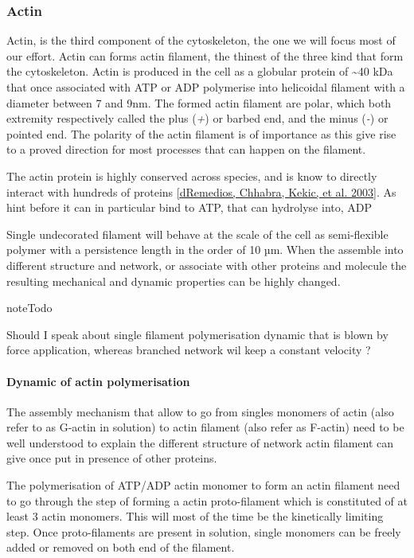 \documentclass[A4paperpaper,11pt,english]{sphinxmanual}
\begin{document}
\subsubsection{Actin}
\label{parts/part1:actin}
Actin, is the third component of the cytoskeleton, the one we will focus most
of our effort. Actin can forms actin filament, the thinest of the three kind
that form the cytoskeleton. Actin is produced in the cell as a globular protein
of \textasciitilde{}40 kDa that once associated with ATP or ADP polymerise into helicoidal
filament with a diameter between 7 and 9nm. The formed actin filament are
polar, which both extremity respectively called the plus (\emph{+}) or
barbed end, and the minus (\emph{-}) or pointed end. The polarity of the actin
filament is of importance as this give rise to a proved direction for most
processes that can happen on the filament.

The actin protein is highly conserved across species, and is know to directly
interact with hundreds of proteins {\hyperref[bibitem:dosremedios2003]{{[}dRemedios, Chhabra, Kekic,  et al.  2003{]}}}. As hint before it
can in particular bind to ATP, that can hydrolyse into, ADP

Single undecorated filament will behave at the scale of the cell as
semi-flexible polymer with a persistence length in the order of 10 µm. When the
assemble into different structure and network, or associate with other proteins
and molecule the resulting mechanical and dynamic properties can be highly changed.

\begin{notice}{note}{Todo}

Should I speak about single filament polymerisation dynamic that is blown
by force application, whereas branched network wil keep a constant velocity
?
\end{notice}


\paragraph{Dynamic of actin polymerisation}
\label{parts/part1:dynamic-of-actin-polymerisation}
The assembly mechanism that allow to go from singles monomers of actin (also
refer to as G-actin in solution) to actin filament (also refer as F-actin)
need to be well understood to explain the different structure of network actin
filament can give once put in presence of other proteins.

The polymerisation of ATP/ADP actin monomer to form an actin filament need to go
through the step of forming a actin proto-filament which is constituted of at
least 3 actin monomers. This will most of the time be the kinetically limiting
step. Once proto-filaments are present in solution, single monomers can be
freely added or removed on both end of the filament.
\end{document}
